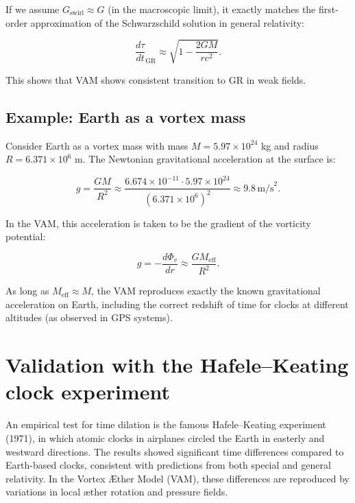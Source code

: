If we assume $G_{\text{swirl}} \approx G$ (in the macroscopic limit), it exactly matches the first-order approximation of the Schwarzschild solution in general relativity:

\begin{equation}
    \frac{d\tau}{dt}_\text{GR} \approx \sqrt{1 - \frac{2GM}{rc^2}}.
\end{equation}

This shows that VAM shows consistent transition to GR in weak fields.

\subsection{Example: Earth as a vortex mass}

Consider Earth as a vortex mass with mass $M = 5.97 \times 10^{24}$ kg and radius $R = 6.371 \times 10^6$ m. The Newtonian gravitational acceleration at the surface is:

\begin{equation}
    g = \frac{G M}{R^2} \approx \frac{6.674 \times 10^{-11} \cdot 5.97 \times 10^{24}}{(6.371 \times 10^6)^2} \approx 9.8 \, \text{m/s}^2.

\end{equation}

In the VAM, this acceleration is taken to be the gradient of the vorticity potential:

\begin{equation}
    g = -\frac{d\Phi_v}{dr} \approx \frac{G M_{\text{eff}}}{R^2}.
\end{equation}

As long as $M_{\text{eff}} \approx M$, the VAM reproduces exactly the known gravitational acceleration on Earth, including the correct redshift of time for clocks at different altitudes (as observed in GPS systems).

\section{Validation with the Hafele–Keating clock experiment}

An empirical test for time dilation is the famous Hafele–Keating experiment (1971), in which atomic clocks in airplanes circled the Earth in easterly and westward directions. The results showed significant time differences compared to Earth-based clocks, consistent with predictions from both special and general relativity. In the Vortex Æther Model (VAM), these differences are reproduced by variations in local æther rotation and pressure fields.

